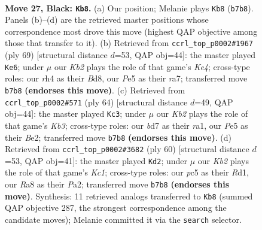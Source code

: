 \documentclass[11pt]{article}
\begin{document}
\clearpage

\begin{figure}[p]\centering
\begin{subfigure}{0.46\textwidth}\centering
\resizebox{\linewidth}{!}{%
\newchessgame
\chessboard[
  setfen={r4b1r/pk1B4/8/2PnpP1p/1P5R/8/8/R1B1K3 b Q - 4 27},
  showmover=false,
  pgfstyle=straightmove, color=movearrow, markmove={b7-b8}
]}
\caption{}
\end{subfigure}\hfill
\begin{subfigure}{0.46\textwidth}\centering
\resizebox{\linewidth}{!}{%
\newchessgame
\chessboard[
  setfen={1r1b4/R4p1p/1P1r2p1/B3k3/8/3p1P2/5P1P/1R1K4 b - - 3 35},
  showmover=false,
  pgfstyle=straightmove, color=movearrow, markmove={e5-e6}
]}
\caption{}
\end{subfigure}
\\[4pt]
\begin{subfigure}{0.46\textwidth}\centering
\resizebox{\linewidth}{!}{%
\newchessgame
\chessboard[
  setfen={5k2/5p1p/4b3/pR6/2Pr4/1K6/2R1B1PP/r7 w - - 6 33},
  showmover=false,
  pgfstyle=straightmove, color=movearrow, markmove={b3-c3}
]}
\caption{}
\end{subfigure}\hfill
\begin{subfigure}{0.46\textwidth}\centering
\resizebox{\linewidth}{!}{%
\newchessgame
\chessboard[
  setfen={5k2/1p6/p1r1b2R/3p4/8/3B1r2/PPP5/2KR4 w - - 0 31},
  showmover=false,
  pgfstyle=straightmove, color=movearrow, markmove={c1-d2}
]}
\caption{}
\end{subfigure}
\caption{\textbf{Move 27, Black: \texttt{Kb8}.} (a) Our position; Melanie plays \texttt{Kb8} (\texttt{b7b8}). Panels (b)--(d) are the retrieved master positions whose correspondence most drove this move (highest QAP objective among those that transfer to it). (b) Retrieved from \texttt{ccrl\_top\_p0002\#1967} (ply 69) [structural distance $d$=53, QAP obj=44]: the master played \texttt{Ke6}; under $\mu$ our \emph{Kb2} plays the role of that game's \emph{Ke4}; cross-type roles: our \emph{r}h4 as their \emph{B}d8, our \emph{P}e5 as their \emph{r}a7; transferred move \texttt{b7b8} \textbf{(endorses this move)}. (c) Retrieved from \texttt{ccrl\_top\_p0002\#571} (ply 64) [structural distance $d$=49, QAP obj=44]: the master played \texttt{Kc3}; under $\mu$ our \emph{Kb2} plays the role of that game's \emph{Kb3}; cross-type roles: our \emph{b}d7 as their \emph{r}a1, our \emph{P}e5 as their \emph{B}e2; transferred move \texttt{b7b8} \textbf{(endorses this move)}. (d) Retrieved from \texttt{ccrl\_top\_p0002\#3682} (ply 60) [structural distance $d$=53, QAP obj=41]: the master played \texttt{Kd2}; under $\mu$ our \emph{Kb2} plays the role of that game's \emph{Kc1}; cross-type roles: our \emph{p}c5 as their \emph{R}d1, our \emph{R}a8 as their \emph{P}a2; transferred move \texttt{b7b8} \textbf{(endorses this move)}. Synthesis: 11 retrieved analogs transferred to \texttt{Kb8} (summed QAP objective 287, the strongest correspondence among the candidate moves); Melanie committed it via the \texttt{search} selector.}
\label{fig:thought-m53}
\end{figure}
\end{document}
